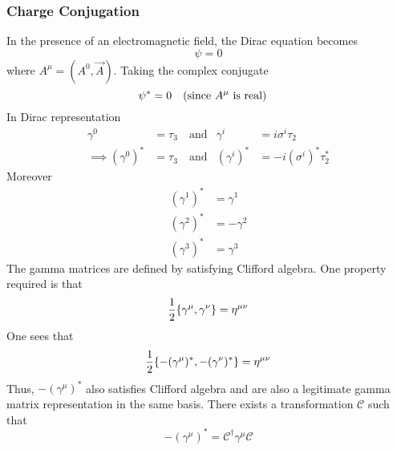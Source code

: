 \documentclass[12pt,a4paper,titlepage]{article}
\newcommand{\trm}[1]{\textrm{#1}} %
\begin{document}
\subsubsection{Charge Conjugation}
In the presence of an electromagnetic field, the Dirac equation becomes
\begin{equation}
[i\gamma^{\mu}(\partial_{\mu}+ieA_{\mu})-m]\psi=0
\end{equation}
where $A^{\mu}=(A^{0},\vec{A})$. Taking the complex conjugate
\begin{equation}
[-i(\gamma^{\mu})^{*}(\partial_{\mu}-ieA_{\mu})-m]\psi^{*}=0\qq{(since $A^{\mu}$ is real)}
\end{equation}
In Dirac representation
\begin{equation}
\begin{aligned}
\gamma^{0}&=\tau_{3} \quad\trm{and} &\gamma^{i}&=i\sigma^{i}\tau_{2}\\
\implies(\gamma^{0})^{*}&=\tau_{3} \quad\trm{and} &(\gamma^{i})^{*}&=-i(\sigma^{i})^{*}\tau_{2}^{*}
\end{aligned}
\end{equation}
Moreover
\begin{equation}
\begin{aligned}
(\gamma^{1})^{*}&=\gamma^{1}\\
(\gamma^{2})^{*}&=-\gamma^{2}\\
(\gamma^{3})^{*}&=\gamma^{3}
\end{aligned}
\end{equation}
The gamma matrices are defined by satisfying Clifford algebra. One property required is that
\begin{equation}
\frac{1}{2}\acomm{\gamma^{\mu}}{\gamma^{\nu}}=\eta^{\mu\nu}
\end{equation}
One sees that
\begin{equation}
\frac{1}{2}\acomm{-(\gamma^{\mu})^{*}}{-(\gamma^{\nu})^{*}}=\eta^{\mu\nu}
\end{equation}
Thus, $-(\gamma^{\mu})^{*}$ also satisfies Clifford algebra and are also a legitimate gamma matrix representation in the same basis. There exists a transformation $\mathcal{C}$ such that
\begin{equation}
-(\gamma^{\mu})^{*}=\mathcal{C}^{\dagger}\gamma^{\mu}\mathcal{C}
\end{equation}
\end{document}

